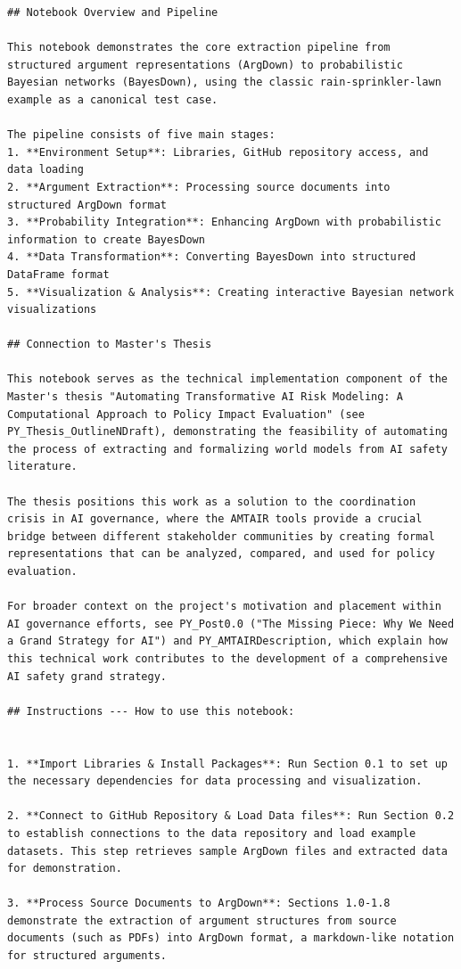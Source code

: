 \documentclass[
  11pt,
  letterpaper,
]{book}
\begin{document}
\begin{verbatim}
## Notebook Overview and Pipeline

This notebook demonstrates the core extraction pipeline from structured argument representations (ArgDown) to probabilistic Bayesian networks (BayesDown), using the classic rain-sprinkler-lawn example as a canonical test case.

The pipeline consists of five main stages:
1. **Environment Setup**: Libraries, GitHub repository access, and data loading
2. **Argument Extraction**: Processing source documents into structured ArgDown format
3. **Probability Integration**: Enhancing ArgDown with probabilistic information to create BayesDown
4. **Data Transformation**: Converting BayesDown into structured DataFrame format
5. **Visualization & Analysis**: Creating interactive Bayesian network visualizations

## Connection to Master's Thesis

This notebook serves as the technical implementation component of the Master's thesis "Automating Transformative AI Risk Modeling: A Computational Approach to Policy Impact Evaluation" (see PY_Thesis_OutlineNDraft), demonstrating the feasibility of automating the process of extracting and formalizing world models from AI safety literature.

The thesis positions this work as a solution to the coordination crisis in AI governance, where the AMTAIR tools provide a crucial bridge between different stakeholder communities by creating formal representations that can be analyzed, compared, and used for policy evaluation.

For broader context on the project's motivation and placement within AI governance efforts, see PY_Post0.0 ("The Missing Piece: Why We Need a Grand Strategy for AI") and PY_AMTAIRDescription, which explain how this technical work contributes to the development of a comprehensive AI safety grand strategy.

## Instructions --- How to use this notebook:


1. **Import Libraries & Install Packages**: Run Section 0.1 to set up the necessary dependencies for data processing and visualization.

2. **Connect to GitHub Repository & Load Data files**: Run Section 0.2 to establish connections to the data repository and load example datasets. This step retrieves sample ArgDown files and extracted data for demonstration.

3. **Process Source Documents to ArgDown**: Sections 1.0-1.8 demonstrate the extraction of argument structures from source documents (such as PDFs) into ArgDown format, a markdown-like notation for structured arguments.


\end{verbatim}
\end{document}
